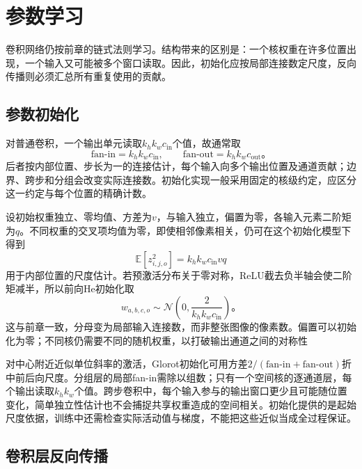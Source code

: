 \section{参数学习}
\label{sec:cnn-learning}

卷积网络仍按前章的链式法则学习。结构带来的区别是：一个核权重在许多位置出现，一个输入又可能被多个窗口读取。因此，初始化应按局部连接数定尺度，反向传播则必须汇总所有重复使用的贡献。

\subsection{参数初始化}
\label{sec:cnn-initialization}

对普通卷积，一个输出单元读取$k_hk_wc_{\mathrm{in}}$个值，故通常取
\begin{equation}
  \mathrm{fan\text{-}in}=k_hk_wc_{\mathrm{in}},\qquad
  \mathrm{fan\text{-}out}=k_hk_wc_{\mathrm{out}}\text{。}
  \label{eq:cnn-fans}
\end{equation}
后者按内部位置、步长为一的连接估计，每个输入向多个输出位置及通道贡献；边界、跨步和分组会改变实际连接数。初始化实现一般采用固定的核级约定，应区分这一约定与每个位置的精确计数。

设初始权重独立、零均值、方差为$v$，与输入独立，偏置为零，各输入元素二阶矩为$q$。不同权重的交叉项均值为零，即使相邻像素相关，仍可在这个初始化模型下得到
\[
  \mathbb E[z_{i,j,o}^2]=k_hk_wc_{\mathrm{in}}vq
\]
用于内部位置的尺度估计。若预激活分布关于零对称，ReLU截去负半轴会使二阶矩减半，所以前向He初始化取
\begin{equation}
  w_{a,b,c,o}\sim\mathcal N\!\left(0,
          \frac{2}{k_hk_wc_{\mathrm{in}}}\right)\text{。}
  \label{eq:cnn-he-initialization}
\end{equation}
这与前章一致，分母变为局部输入连接数，而非整张图像的像素数。偏置可以初始化为零；不同核仍需要不同的随机权重，以打破输出通道之间的对称性

对中心附近近似单位斜率的激活，Glorot初始化可用方差$2/(\mathrm{fan\text{-}in}+\mathrm{fan\text{-}out})$折中前后向尺度。分组层的局部fan-in需除以组数；只有一个空间核的逐通道层，每个输出读取$k_hk_w$个值。跨步卷积中，每个输入参与的输出窗口更少且可能随位置变化，简单独立性估计也不会捕捉共享权重造成的空间相关。初始化提供的是起始尺度依据，训练中还需检查实际活动值与梯度，不能把这些近似当成全过程保证。

\subsection{卷积层反向传播}
\label{sec:cnn-backpropagation}

